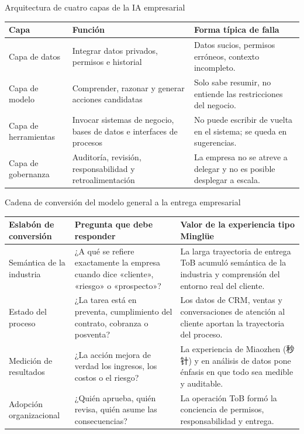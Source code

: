 \begin{knowledgebox}{Arquitectura de cuatro capas de la IA empresarial}
\begin{tabularx}{\textwidth}{p{}p{}X}
\toprule
Capa & Función & Forma típica de falla \\
\midrule
Capa de datos & Integrar datos privados, permisos e historial & Datos sucios, permisos erróneos, contexto incompleto. \\
Capa de modelo & Comprender, razonar y generar acciones candidatas & Solo sabe resumir, no entiende las restricciones del negocio. \\
Capa de herramientas & Invocar sistemas de negocio, bases de datos e interfaces de procesos & No puede escribir de vuelta en el sistema; se queda en sugerencias. \\
Capa de gobernanza & Auditoría, revisión, responsabilidad y retroalimentación & La empresa no se atreve a delegar y no es posible desplegar a escala. \\
\bottomrule
\end{tabularx}
\end{knowledgebox}

\begin{knowledgebox}{Cadena de conversión del modelo general a la entrega empresarial}
\begin{tabularx}{\textwidth}{p{}p{}X}
\toprule
Eslabón de conversión & Pregunta que debe responder & Valor de la experiencia tipo Minglüe \\
\midrule
Semántica de la industria & ¿A qué se refiere exactamente la empresa cuando dice «cliente», «riesgo» o «prospecto»? & La larga trayectoria de entrega ToB acumuló semántica de la industria y comprensión del entorno real del cliente. \\
Estado del proceso & ¿La tarea está en preventa, cumplimiento del contrato, cobranza o posventa? & Los datos de CRM, ventas y conversaciones de atención al cliente aportan la trayectoria del proceso. \\
Medición de resultados & ¿La acción mejora de verdad los ingresos, los costos o el riesgo? & La experiencia de Miaozhen (秒针) y en análisis de datos pone énfasis en que todo sea medible y auditable. \\
Adopción organizacional & ¿Quién aprueba, quién revisa, quién asume las consecuencias? & La operación ToB formó la conciencia de permisos, responsabilidad y entrega. \\
\bottomrule
\end{tabularx}
\end{knowledgebox}

